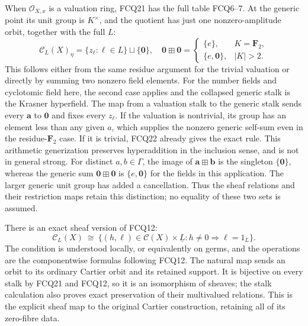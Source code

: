 When $\mathcal O_{X,x}$ is a valuation ring, FCQ21 has
the full table FCQ6--7. At the generic point its unit
group is $K^\times$, and the quotient has just one
nonzero-amplitude orbit, together with the full $L$:
\begin{equation}\tag{FCQ22}
\mathscr C_L(X)_\eta=\{z_\ell:\ell\in L\}\sqcup\{\mathbf0\},
\quad
\mathbf0\boxplus\mathbf0=
\begin{cases}
\{e\},&K=\mathbf F_2,\\
\{e,\mathbf0\},&|K|>2.
\end{cases}
\end{equation}
This follows either from the same residue argument for
the trivial valuation or directly by summing two nonzero
field elements. For the number fields and cyclotomic
field here, the second case applies and the collapsed
generic stalk is the Krasner hyperfield. The map from a
valuation stalk to the generic stalk sends every
$\mathbf a$ to $\mathbf0$ and fixes every $z_\ell$.
If the valuation is nontrivial, its group has an element
less than any given $a$, which supplies the nonzero
generic self-sum even in the residue-$\mathbf F_2$ case.
If it is trivial, FCQ22 already gives the exact rule.
This arithmetic generization preserves hyperaddition in the
inclusion sense, and is not in general strong. For distinct
$a,b\in\Gamma$, the image of
$\mathbf a\boxplus\mathbf b$ is the singleton
$\{\mathbf0\}$, whereas the generic sum
$\mathbf0\boxplus\mathbf0$ is $\{e,\mathbf0\}$ for
the fields in this application. The larger generic
unit group has added a cancellation. Thus the sheaf
relations and their restriction maps retain this
distinction; no equality of these two sets is assumed.

There is an exact sheaf version of FCQ12:
\begin{equation}\tag{FCQ23}
\mathscr C_L(X)\ \cong\
\{(h,\ell)\in\mathscr C(X)\times\underline L:
                         h\ne0\Longrightarrow\ell=1_L\}.
\end{equation}
The condition is understood locally, or equivalently on
germs, and the operations are the componentwise formulas
following FCQ12. The natural map sends an orbit to its
ordinary Cartier orbit and its retained support. It is
bijective on every stalk by FCQ21 and FCQ12, so it is
an isomorphism of sheaves; the stalk calculation also
proves exact preservation of their multivalued relations.
This is the explicit sheaf map to the original Cartier
construction, retaining all of its zero-fibre data.

